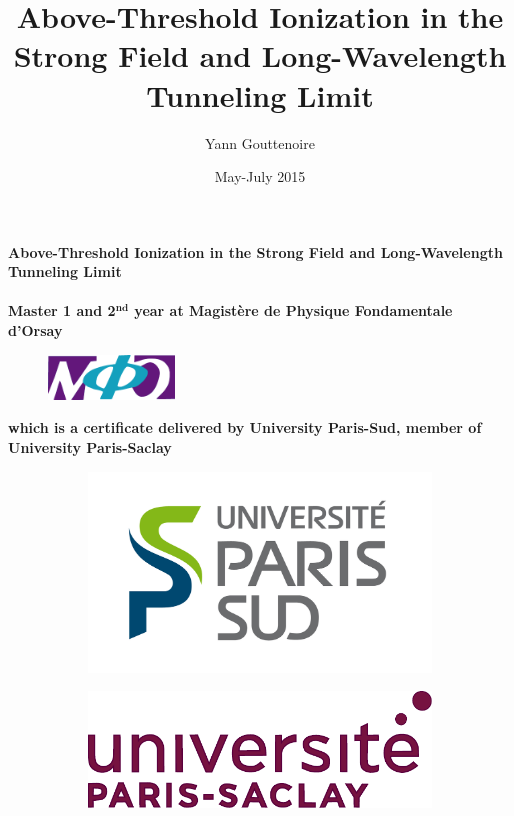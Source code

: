 \documentclass[a4paper]{article}
\title{Above-Threshold Ionization in the Strong Field and Long-Wavelength Tunneling Limit}
\author{Yann Gouttenoire}
\date{May-July 2015}
\begin{document}
\makeatletter

  \begin{titlepage}
  \centering
  {\LARGE \textbf{Above-Threshold Ionization in the Strong Field and Long-Wavelength Tunneling Limit}} \\
      \vspace{1cm}
  {\large \@author} \\
      \vspace{1cm}
  {\textbf{Master 1 and 2$^{\textbf{nd}}$ year at Magist\`ere de Physique Fondamentale d'Orsay}} \\
      \vspace{1cm}
      \begin{figure}[h]
      \centering
    \includegraphics[width=0.30\textwidth]{logo/magistere}
      \end{figure}
  {\textbf{which is a certificate delivered by University Paris-Sud, member of University Paris-Saclay}} \\ 
        
   \begin{figure}[h]
   \centering
   \begin{subfigure}[l]{0.30\textwidth}
       \includegraphics[width=\textwidth]{logo/upsud}
   \end{subfigure}
   \hfill
   \begin{subfigure}[r]{0.30\textwidth}
       \includegraphics[width=\textwidth]{logo/upsaclay}
   \end{subfigure}
   \end{figure}
        \vfill


\end{titlepage}
\end{document}
